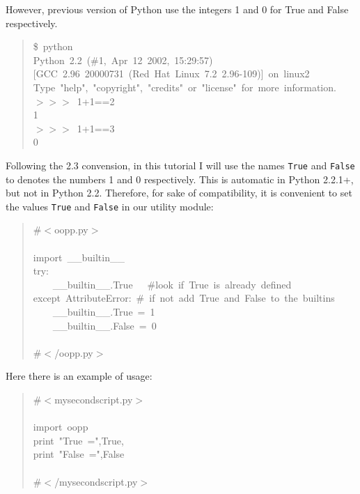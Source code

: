 \documentclass[11pt,english]{book}
\begin{document}
However, previous version of Python use the integers 1 and 0 for 
True and False respectively.
\begin{quote}
\begin{ttfamily}\begin{flushleft}
\mbox{{\$}~python}\\
\mbox{Python~2.2~({\#}1,~Apr~12~2002,~15:29:57)}\\
\mbox{[GCC~2.96~20000731~(Red~Hat~Linux~7.2~2.96-109)]~on~linux2}\\
\mbox{Type~"help",~"copyright",~"credits"~or~"license"~for~more~information.}\\
\mbox{{$>$}{$>$}{$>$}~1+1==2}\\
\mbox{1}\\
\mbox{{$>$}{$>$}{$>$}~1+1==3~}\\
\mbox{0}
\end{flushleft}\end{ttfamily}
\end{quote}

Following the 2.3 convension, in this tutorial I will use the names 
\texttt{True} and \texttt{False} to denotes the numbers 1 and 0 respectively. 
This is automatic in Python 2.2.1+, but not in Python 2.2. Therefore, 
for sake of compatibility, it is convenient to set the values \texttt{True} 
and \texttt{False} in our utility module:
\begin{quote}
\begin{ttfamily}\begin{flushleft}
\mbox{{\#}{$<$}oopp.py{$>$}}\\
\mbox{}\\
\mbox{import~{\_}{\_}builtin{\_}{\_}}\\
\mbox{try:~}\\
\mbox{~~~~{\_}{\_}builtin{\_}{\_}.True~~~{\#}look~if~True~is~already~defined}\\
\mbox{except~AttributeError:~{\#}~if~not~add~True~and~False~to~the~builtins}\\
\mbox{~~~~{\_}{\_}builtin{\_}{\_}.True~=~1}\\
\mbox{~~~~{\_}{\_}builtin{\_}{\_}.False~=~0}\\
\mbox{}\\
\mbox{{\#}{$<$}/oopp.py{$>$}}
\end{flushleft}\end{ttfamily}
\end{quote}

Here there is an example of usage:
\begin{quote}
\begin{ttfamily}\begin{flushleft}
\mbox{{\#}{$<$}mysecondscript.py{$>$}}\\
\mbox{}\\
\mbox{import~oopp}\\
\mbox{print~"True~=",True,}\\
\mbox{print~"False~=",False}\\
\mbox{}\\
\mbox{{\#}{$<$}/mysecondscript.py{$>$}}
\end{flushleft}\end{ttfamily}
\end{quote}
\end{document}
